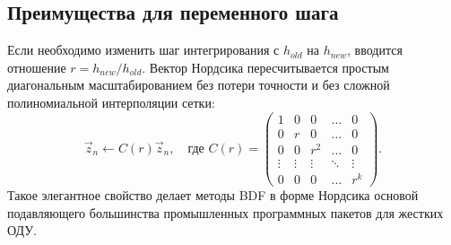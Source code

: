 \documentclass[12pt,a4paper]{article}
\begin{document}
\subsection{Преимущества для переменного шага}
Если необходимо изменить шаг интегрирования с $h_{old}$ на $h_{new}$, вводится отношение $r = h_{new}/h_{old}$. Вектор Нордсика пересчитывается простым диагональным масштабированием без потери точности и без сложной полиномиальной интерполяции сетки:
\begin{equation}
    \vec{z}_{n} \leftarrow C(r) \vec{z}_n, \quad \text{где } C(r) = \begin{pmatrix} 1 & 0 & 0 & \dots & 0 \\ 0 & r & 0 & \dots & 0 \\ 0 & 0 & r^2 & \dots & 0 \\ \vdots & \vdots & \vdots & \ddots & \vdots \\ 0 & 0 & 0 & \dots & r^k \end{pmatrix}.
\end{equation}
Такое элегантное свойство делает методы BDF в форме Нордсика основой подавляющего большинства промышленных программных пакетов для жестких ОДУ.
\end{document}
